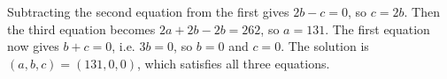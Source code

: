 Subtracting the second equation from the first gives $2b-c=0$, so $c=2b$. Then the third equation becomes $2a+2b-2b=262$, so $a=131$. The first equation now gives $b+c=0$, i.e. $3b=0$, so $b=0$ and $c=0$. The solution is $\boxed{(a,b,c)=(131,0,0)}$, which satisfies all three equations.
